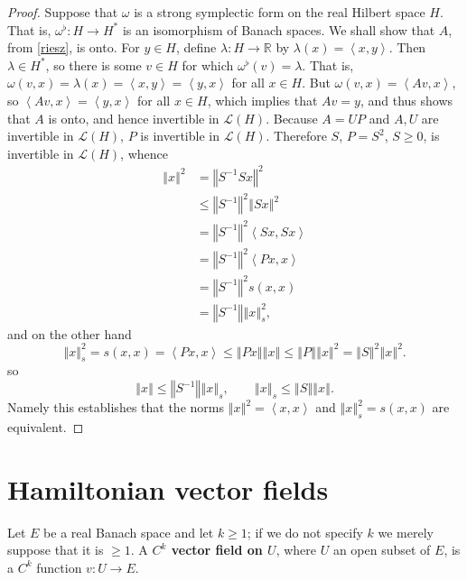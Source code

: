 \documentclass{article}
\newcommand{\inner}[2]{\left\langle #1, #2 \right\rangle}
\newcommand{\norm}[1]{\left\Vert #1 \right\Vert}
\theoremstyle{definition}
\theoremstyle{definition}
\begin{document}
\begin{proof}
Suppose that $\omega$ is a strong symplectic form on the real Hilbert space $H$. 
That is, $\omega^\flat:H \to H^*$ is an isomorphism of Banach spaces. We shall show that
$A$, from \eqref{riesz}, is onto. For $y \in H$, define $\lambda:H \to \mathbb{R}$ by
$\lambda(x) = \inner{x}{y}$. Then $\lambda \in H^*$, so there is some
$v \in H$ for which $\omega^\flat(v)=\lambda$. That is,
$\omega(v,x)=\lambda(x)=\inner{x}{y}=\inner{y}{x}$ for all $x \in H$. 
But $\omega(v,x) = \inner{Av}{x}$, so 
$\inner{Av}{x}=\inner{y}{x}$ for all $x \in H$, which implies that $Av=y$, and thus shows that
$A$ is onto, and hence invertible in $\mathscr{L}(H)$. 
Because $A=UP$ and $A,U$ are invertible in $\mathscr{L}(H)$, $P$ is invertible
in $\mathscr{L}(H)$.
Therefore $S$, $P=S^2$, $S \geq 0$, is invertible in $\mathscr{L}(H)$, whence
\begin{align*}
\norm{x}^2 &= \norm{S^{-1} Sx}^2\\
&\leq \norm{S^{-1}}^2 \norm{Sx}^2\\
&=\norm{S^{-1}}^2 \inner{Sx}{Sx}\\
&=\norm{S^{-1}}^2 \inner{Px}{x}\\
&=\norm{S^{-1}}^2 s(x,x)\\
&=\norm{S^{-1}} \norm{x}_s^2,
\end{align*}
and on the other hand
\[
\norm{x}_s^2=s(x,x) = \inner{Px}{x} \leq \norm{Px} \norm{x} \leq \norm{P} \norm{x}^2=\norm{S}^2 \norm{x}^2.
\]
so
\[
\norm{x} \leq \norm{S^{-1}} \norm{x}_s, \qquad \norm{x}_s \leq 
\norm{S} \norm{x}.
\]
Namely this establishes that  the norms $\norm{x}^2 = \inner{x}{x}$ and
$\norm{x}_s^2 = s(x,x)$ are equivalent.
\end{proof}


\section{Hamiltonian vector fields}
Let $E$ be a real Banach space and let $k \geq 1$; if we do not specify $k$ we merely suppose that it is $\geq 1$.
A \textbf{$C^k$ vector field on $U$}, where $U$ an open subset of $E$, is a $C^k$ function $v:U \to E$.
\end{document}
